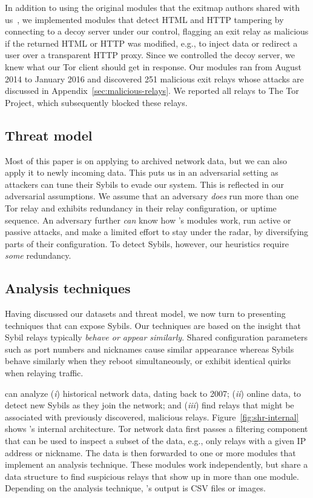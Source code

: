 In addition to using the original modules that the exitmap authors shared with
us~\cite[\S~3.1]{Winter2014a}, we implemented modules that detect HTML and HTTP
tampering by connecting to a decoy server under our control, flagging an exit
relay as malicious if the returned HTML or HTTP was modified, e.g., to inject
data or redirect a user over a transparent HTTP proxy.  Since we controlled the
decoy server, we knew what our Tor client should get in response.  Our modules
ran from August 2014 to January 2016 and discovered 251 malicious exit relays
whose attacks are discussed in Appendix~\ref{sec:malicious-relays}.  We
reported all relays to The Tor Project, which subsequently blocked these
relays.

\subsection{Threat model}
\label{sec:threat_model}
Most of this paper is on applying \sys to archived network data, but we can also
apply it to newly incoming data.  This puts us in an adversarial setting as
attackers can tune their Sybils to evade our system.  This is reflected in our
adversarial assumptions.  We assume that an adversary \emph{does} run more than
one Tor relay and exhibits redundancy in their relay configuration, or uptime
sequence.  An adversary further \emph{can} know how \sys's modules work, run
active or passive attacks, and make a limited effort to stay under the radar, by
diversifying parts of their configuration.  To detect Sybils, however, our
heuristics require \emph{some} redundancy.

\subsection{Analysis techniques}
\label{sec:techniques}
Having discussed our datasets and threat model, we now turn to presenting
techniques that can expose Sybils.  Our techniques are based on the insight that
Sybil relays typically \emph{behave or appear similarly}.  Shared configuration
parameters such as port numbers and nicknames cause similar appearance whereas
Sybils behave similarly when they reboot simultaneously, or exhibit identical
quirks when relaying traffic.

\Sys can analyze (\emph{i}) historical network data, dating back to 2007;
(\emph{ii}) online data, to detect new Sybils as they join the network; and
(\emph{iii}) find relays that might be associated with previously discovered,
malicious relays.  Figure~\ref{fig:shr-internal} shows \sys's internal
architecture.  Tor network data first passes a filtering component that can be
used to inspect a subset of the data, e.g., only relays with a given IP address
or nickname.  The data is then forwarded to one or more modules that implement
an analysis technique.  These modules work independently, but share a data
structure to find suspicious relays that show up in more than one module.
Depending on the analysis technique, \sys's output is CSV files or images.

